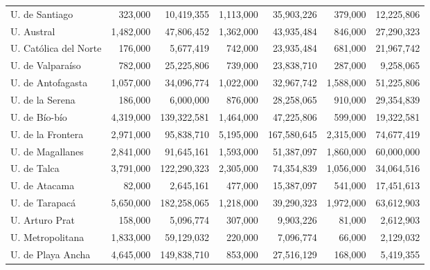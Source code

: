 \documentclass[twocolumn]{article}
\begin{document}
\begin{table}[t]
\begin{tabular}{l rr rr rr}
U. de Santiago                 &       323,000 &      10,419,355 &     1,113,000 &      35,903,226 &       379,000 &      12,225,806 \\
U. Austral                     &     1,482,000 &      47,806,452 &     1,362,000 &      43,935,484 &       846,000 &      27,290,323 \\
U. Católica del Norte          &       176,000 &       5,677,419 &       742,000 &      23,935,484 &       681,000 &      21,967,742 \\
U. de Valparaíso               &       782,000 &      25,225,806 &       739,000 &      23,838,710 &       287,000 &       9,258,065 \\
U. de Antofagasta              &     1,057,000 &      34,096,774 &     1,022,000 &      32,967,742 &     1,588,000 &      51,225,806 \\
U. de la Serena                &       186,000 &       6,000,000 &       876,000 &      28,258,065 &       910,000 &      29,354,839 \\
U. de Bío-bío                  &     4,319,000 &     139,322,581 &     1,464,000 &      47,225,806 &       599,000 &      19,322,581 \\
U. de la Frontera              &     2,971,000 &      95,838,710 &     5,195,000 &     167,580,645 &     2,315,000 &      74,677,419 \\
U. de Magallanes               &     2,841,000 &      91,645,161 &     1,593,000 &      51,387,097 &     1,860,000 &      60,000,000 \\
U. de Talca                    &     3,791,000 &     122,290,323 &     2,305,000 &      74,354,839 &     1,056,000 &      34,064,516 \\
U. de Atacama                  &        82,000 &       2,645,161 &       477,000 &      15,387,097 &       541,000 &      17,451,613 \\
U. de Tarapacá                 &     5,650,000 &     182,258,065 &     1,218,000 &      39,290,323 &     1,972,000 &      63,612,903 \\
U. Arturo Prat                 &       158,000 &       5,096,774 &       307,000 &       9,903,226 &        81,000 &       2,612,903 \\
U. Metropolitana               &     1,833,000 &      59,129,032 &       220,000 &       7,096,774 &        66,000 &       2,129,032 \\
U. de Playa Ancha              &     4,645,000 &     149,838,710 &       853,000 &      27,516,129 &       168,000 &       5,419,355 \\

\end{tabular}
\end{table}
\end{document}
